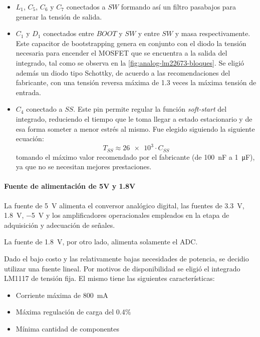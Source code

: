 \documentclass[titlepage, 12pt]{article}
\begin{document}
\begin{itemize}
    \item $L_1$, $C_5$, $C_6$ y $C_7$ conectados a $SW$ formando así un filtro pasabajos para generar la tensión de salida.

    \item $C_1$ y $D_1$ conectados entre $BOOT$ y $SW$ y entre $SW$ y masa respectivamente. Este capacitor de bootstrapping genera en conjunto con el diodo la tensión necesaria para encender el MOSFET que se encuentra a la salida del integrado, tal como se observa en la \autoref{fig:analog-lm22673-bloques}. Se eligió además un diodo tipo Schottky, de acuerdo a las recomendaciones del fabricante, con una tensión reversa máxima  de 1.3 veces la máxima tensión de entrada.

    \item $C_4$ conectado a $SS$. Este pin permite regular la función \emph{soft-start} del integrado, reduciendo el tiempo que le toma llegar a estado estacionario y de esa forma someter a menor estrés al mismo. Fue elegido siguiendo la siguiente ecuación:
      \[
        T_{SS} \approx \num{26e3} \cdot C_{SS}
      \]
    tomando el máximo valor recomendado por el fabricante (de \SI{100}{nF} a \SI{1}{\micro F}), ya que no se necesitan mejores prestaciones.

    \end{itemize}

      \paragraph{Fuente de alimentación de 5V y 1.8V}
      La fuente de \SI{5}{V} alimenta el conversor analógico digital, las fuentes de \SI{3.3}{V}, \SI{1.8}{V}, \SI{-5}{V} y los amplificadores operacionales empleados en la etapa de adquisición y adecuación de señales.

      La fuente de \SI{1.8}{V}, por otro lado, alimenta solamente el ADC.

      Dado el bajo costo y las relativamente bajas necesidades de potencia, se decidio utilizar una fuente lineal. Por motivos de disponibilidad se eligió el integrado LM1117 de tensión fija. El mismo tiene las siguientes características:

          \begin{itemize}
              \item Corriente máxima de \SI{800}{mA}
              \item Máxima regulación de carga del 0.4\%
              \item Mínima cantidad de componentes
          \end{itemize}
\end{document}
